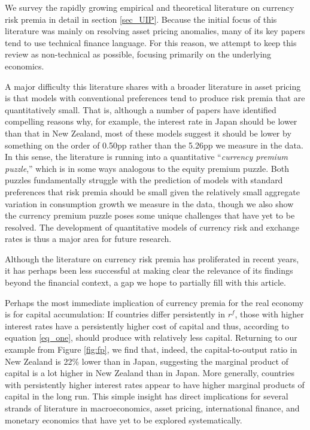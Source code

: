 \documentclass[11pt]{article}
\begin{document}
We survey the rapidly growing empirical and theoretical literature on currency risk premia in detail in section \ref{sec_UIP}. Because the initial focus of this literature was mainly on resolving asset pricing anomalies, many of its key papers tend to use technical finance language. For this reason, we attempt to keep this review as non-technical as possible, focusing primarily on the underlying economics.

A major difficulty this literature shares with a broader literature in asset pricing is that models with conventional preferences tend to produce risk premia that are quantitatively small. That is, although a number of papers have identified compelling reasons why, for example, the interest rate in Japan should be lower than that in New Zealand, most of these models suggest it should be lower by something on the order of 0.50pp rather than the 5.26pp we measure in the data. In this sense, the literature is running into a quantitative ``\textit{currency premium puzzle},'' which is in some ways analogous to the equity premium puzzle. Both puzzles fundamentally struggle with the prediction of models with standard preferences that risk premia should be small given the relatively small aggregate variation in consumption growth we measure in the data, though we also show the currency premium puzzle poses some unique challenges that have yet to be resolved. The development of quantitative models of currency risk and exchange rates is thus a major area for future research.

Although the literature on currency risk premia has proliferated in recent years, it has perhaps been less successful at making clear the relevance of its findings beyond the financial context, a gap we hope to partially fill with this article.

Perhaps the most immediate implication of currency premia for the real economy is for capital accumulation: If countries differ persistently in $r^f$, those with higher interest rates have a persistently higher cost of capital and thus, according to equation \ref{eq_one}, should produce with relatively less capital. Returning to our example from Figure \ref{fig:fp}, we find that, indeed, the capital-to-output ratio in New Zealand is 22\% lower than in Japan, suggesting the marginal product of capital is a lot higher in New Zealand than in Japan. More generally, countries with persistently higher interest rates appear to have higher marginal products of capital in the long run. This simple insight has direct implications for several strands of literature in macroeconomics, asset pricing, international finance, and monetary economics that have yet to be explored systematically.
\end{document}
